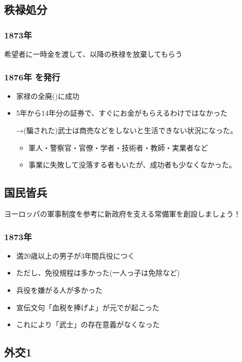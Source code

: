 \documentclass[12pt,fleqn]{ltjsarticle}
\begin{document}
\subsection{秩禄処分}
\subsubsection*{1873年 }
希望者に一時金を渡して、以降の秩禄を放棄してもらう
\subsubsection*{1876年 を発行}
\begin{itemize}
\item 家禄の全廃()に成功
\item 5年から14年分の証券で、すぐにお金がもらえるわけではなかった

→(騙された)武士は商売などをしないと生活できない状況になった。
\begin{itemize}
\item 軍人・警察官・官僚・学者・技術者・教師・実業者など
\item 事業に失敗して没落する者もいたが、成功者も少なくなかった。
\end{itemize}
\end{itemize}

\subsection{国民皆兵}
ヨーロッパの軍事制度を参考に新政府を支える常備軍を創設しましょう！

\subsubsection*{1873年 }
\begin{itemize}
\item 満20歳以上の男子が3年間兵役につく
\item ただし、免役規程は多かった(一人っ子は免除など)
\item 兵役を嫌がる人が多かった
\item 宣伝文句「血税を捧げよ」が元でが起こった
\item これにより「武士」の存在意義がなくなった
\end{itemize}

\subsection{外交1}
\end{document}
